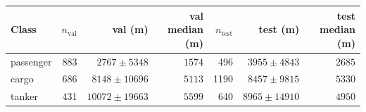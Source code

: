 \begin{tabular}{lrrrrrr}
\toprule
\textbf{Class} & $n_{\mathrm{val}}$ & val \ade{} (m) & val median (m) & $n_{\mathrm{test}}$ & test \ade{} (m) & test median (m) \\
\midrule
passenger & 883 & $2767 \pm 5348$ & $1574$ & 496 & $3955 \pm 4843$ & $2685$ \\
cargo & 686 & $8148 \pm 10696$ & $5113$ & 1190 & $8457 \pm 9815$ & $5330$ \\
tanker & 431 & $10072 \pm 19663$ & $5599$ & 640 & $8965 \pm 14910$ & $4950$ \\
\bottomrule
\end{tabular}
